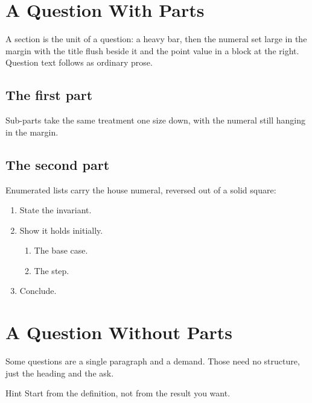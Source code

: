 \section{A Question With Parts }

A section is the unit of a question: a heavy bar, then the numeral set large
in the margin with the title flush beside it and the point value in a block at
the right. Question text follows as ordinary prose.


\subsection{The first part}

Sub-parts take the same treatment one size down, with the numeral still
hanging in the margin.

\subsection{The second part}

Enumerated lists carry the house numeral, reversed out of a solid square:

\begin{enumerate}
    \item State the invariant.
    \item Show it holds initially.
        \begin{enumerate}
            \item The base case.
            \item The step.
        \end{enumerate}
    \item Conclude.
\end{enumerate}

\section{A Question Without Parts }

Some questions are a single paragraph and a demand. Those need no structure,
just the heading and the ask.

\begin{asidebox}{Hint}
    Start from the definition, not from the result you want.
\end{asidebox}
